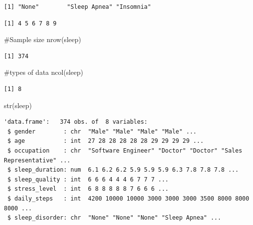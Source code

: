 \documentclass[
  letterpaper,
  DIV=11,
  numbers=noendperiod]{scrartcl}
\newenvironment{Shaded}{\begin{snugshade}}{\end{snugshade}}
\newcommand{\CommentTok}[1]{\textcolor[rgb]{0.37,0.37,0.37}{#1}}
\newcommand{\FunctionTok}[1]{\textcolor[rgb]{0.28,0.35,0.67}{#1}}
\newcommand{\NormalTok}[1]{\textcolor[rgb]{0.00,0.23,0.31}{#1}}
\newcommand{\SpecialCharTok}[1]{\textcolor[rgb]{0.37,0.37,0.37}{#1}}
\begin{document}
\begin{Shaded}
\end{Shaded}

\begin{verbatim}
[1] "None"        "Sleep Apnea" "Insomnia"   
\end{verbatim}

\begin{Shaded}
\end{Shaded}

\begin{verbatim}
[1] 4 5 6 7 8 9
\end{verbatim}

\begin{Shaded}
\begin{Highlighting}[]
\CommentTok{\#Sample size }
\FunctionTok{nrow}\NormalTok{(sleep)}
\end{Highlighting}
\end{Shaded}

\begin{verbatim}
[1] 374
\end{verbatim}

\begin{Shaded}
\begin{Highlighting}[]
\CommentTok{\#types of data}
\FunctionTok{ncol}\NormalTok{(sleep)}
\end{Highlighting}
\end{Shaded}

\begin{verbatim}
[1] 8
\end{verbatim}

\begin{Shaded}
\begin{Highlighting}[]
 \FunctionTok{str}\NormalTok{(sleep)}
\end{Highlighting}
\end{Shaded}

\begin{verbatim}
'data.frame':   374 obs. of  8 variables:
 $ gender        : chr  "Male" "Male" "Male" "Male" ...
 $ age           : int  27 28 28 28 28 28 29 29 29 29 ...
 $ occupation    : chr  "Software Engineer" "Doctor" "Doctor" "Sales Representative" ...
 $ sleep_duration: num  6.1 6.2 6.2 5.9 5.9 5.9 6.3 7.8 7.8 7.8 ...
 $ sleep_quality : int  6 6 6 4 4 4 6 7 7 7 ...
 $ stress_level  : int  6 8 8 8 8 8 7 6 6 6 ...
 $ daily_steps   : int  4200 10000 10000 3000 3000 3000 3500 8000 8000 8000 ...
 $ sleep_disorder: chr  "None" "None" "None" "Sleep Apnea" ...
\end{verbatim}
\end{document}
